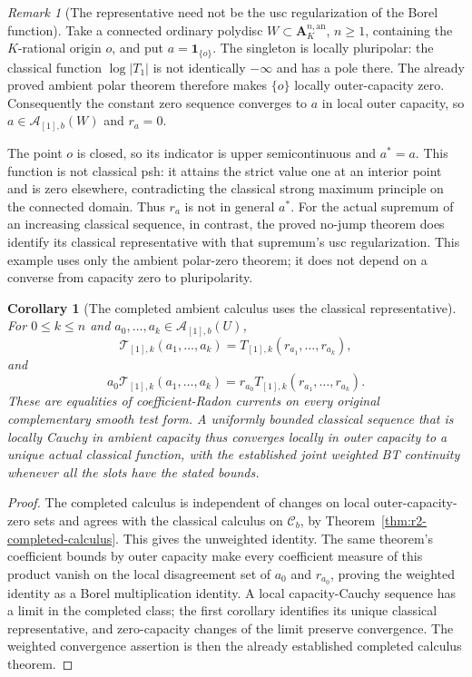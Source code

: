 \documentclass[11pt,a4paper]{article}
\numberwithin{equation}{section}
\newtheorem{corollary}[theorem]{Corollary}
\theoremstyle{definition}
\theoremstyle{remark}
\newtheorem{remark}[theorem]{Remark}
\newcommand{\Cb}{\mathcal C_b}
\newcommand{\an}{\mathrm{an}}
\begin{document}
\begin{remark}[The representative need not be the usc regularization of the Borel function]
Take a connected ordinary polydisc $W\subset\mathbf A_K^{n,\an}$,
$n\geq1$, containing the $K$-rational origin $o$, and put
$a=\mathbf1_{\{o\}}$. The singleton is locally pluripolar:
the classical function $\log|T_1|$ is not identically $-\infty$
and has a pole there. The already proved ambient polar theorem
therefore makes $\{o\}$ locally outer-capacity zero. Consequently
the constant zero sequence converges to $a$ in local outer
capacity, so $a\in\mathcal A_{[1],b}(W)$ and $r_a=0$.

The point $o$ is closed, so its indicator is upper
semicontinuous and $a^*=a$. This function is not classical psh:
it attains the strict value one at an interior point and is zero
elsewhere, contradicting the classical strong maximum principle
on the connected domain. Thus $r_a$ is not in general $a^*$.
For the actual supremum of an increasing classical sequence,
in contrast, the proved no-jump theorem does identify its
classical representative with that supremum's usc regularization.
This example uses only the ambient polar-zero theorem; it does
not depend on a converse from capacity zero to pluripolarity.
\end{remark}

\begin{corollary}[The completed ambient calculus uses the classical representative]
\label{cor:r2-ambient-completed-calculus}
For $0\leq k\leq n$ and
$a_0,\ldots,a_k\in\mathcal A_{[1],b}(U)$,
\[
 \mathcal T_{[1],k}(a_1,\ldots,a_k)
       =T_{[1],k}(r_{a_1},\ldots,r_{a_k}),
\]
and
\[
 a_0\mathcal T_{[1],k}(a_1,\ldots,a_k)
       =r_{a_0}T_{[1],k}(r_{a_1},\ldots,r_{a_k}).
\]
These are equalities of coefficient-Radon currents on every
original complementary smooth test form. A uniformly bounded
classical sequence that is locally Cauchy in ambient capacity
thus converges locally in outer capacity to a unique actual
classical function, with the established joint weighted BT
continuity whenever all the slots have the stated bounds.
\end{corollary}

\begin{proof}
The completed calculus is independent of changes on local
outer-capacity-zero sets and agrees with the classical calculus
on $\Cb$, by Theorem~\ref{thm:r2-completed-calculus}.
This gives the unweighted identity. The same theorem's
coefficient bounds by outer capacity make every coefficient
measure of this product vanish on the local disagreement set
of $a_0$ and $r_{a_0}$, proving the weighted identity as a
Borel multiplication identity. A local capacity-Cauchy sequence
has a limit in the completed class; the first corollary
identifies its unique classical representative, and zero-capacity
changes of the limit preserve convergence. The weighted
convergence assertion is then the already established completed
calculus theorem.
\end{proof}
\end{document}

